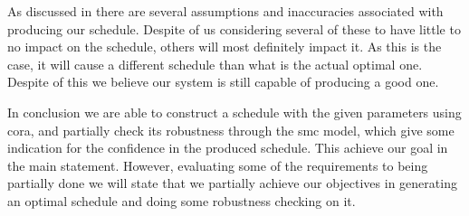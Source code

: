As discussed in  there are several assumptions and inaccuracies associated with producing our schedule. Despite of us considering several of these to have little to no impact on the schedule, others will most definitely impact it. As this is the case, it will cause a different schedule than what is the actual optimal one. Despite of this we believe our system is still capable of producing a good one.

In conclusion we are able to construct a schedule with the given parameters using \gls{cora}, and partially check its robustness through the \gls{smc} model, which give some indication for the confidence in the produced schedule. This achieve our goal in the main statement. However, evaluating some of the requirements to being partially done we will state that we partially achieve our objectives in generating an optimal schedule and doing some robustness checking on it.